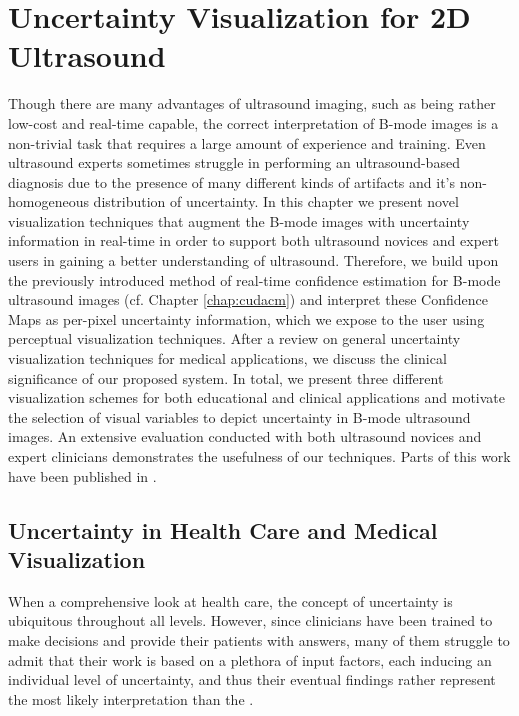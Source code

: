 %
\chapter{Uncertainty Visualization for 2D Ultrasound}
\label{chap:cmvis}

Though there are many advantages of ultrasound imaging, such as being rather low-cost and real-time capable, the correct interpretation of B-mode images is a non-trivial task that requires a large amount of experience and training.
Even ultrasound experts sometimes struggle in performing an ultrasound-based diagnosis due to the presence of many different kinds of artifacts and it's non-homogeneous distribution of uncertainty.
In this chapter we present novel visualization techniques that augment the B-mode images with uncertainty information in real-time in order to support both ultrasound novices and expert users in gaining a better understanding of ultrasound.
Therefore, we build upon the previously introduced method of real-time confidence estimation for B-mode ultrasound images (cf. Chapter \ref{chap:cudacm}) and interpret these Confidence Maps as per-pixel uncertainty information, which we expose to the user using perceptual visualization techniques.
After a review on general uncertainty visualization techniques for medical applications, we discuss the clinical significance of our proposed system.
In total, we present three different visualization schemes for both educational and clinical applications and motivate the selection of visual variables to depict uncertainty in B-mode ultrasound images.
An extensive evaluation conducted with both ultrasound novices and expert clinicians demonstrates the usefulness of our techniques.
Parts of this work have been published in \CN.


\section{Uncertainty in Health Care and Medical Visualization}
\label{sec:cmvis:uncertainty-vis-techniques}
When  a comprehensive look at health care, the concept of uncertainty is ubiquitous throughout all levels.
However, since clinicians have been trained to make decisions and provide their patients with answers, many of them struggle to admit that their work is based on a plethora of input factors, each inducing an individual level of uncertainty, and thus their eventual findings rather represent the most likely interpretation than the .

